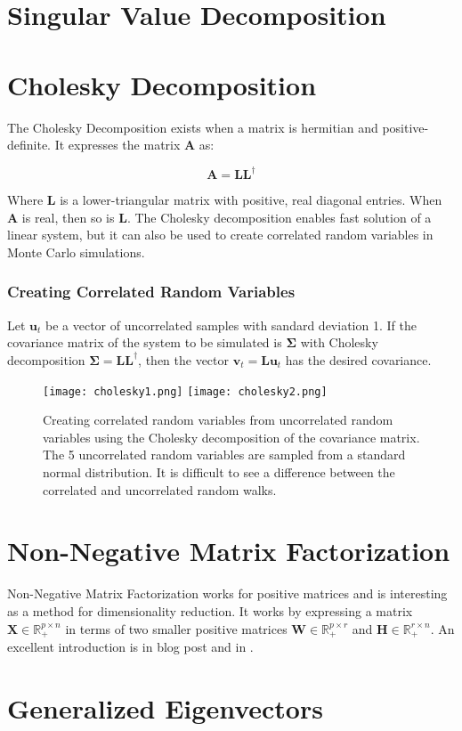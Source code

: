 \section{Singular Value Decomposition}




\section{Cholesky Decomposition}
\label{sec:cholesky}

The Cholesky Decomposition exists when a matrix is hermitian and positive-definite. It expresses the matrix $\mathbf{A}$ as:

\begin{equation}
\mathbf{A} = \mathbf{L}\mathbf{L^\dagger}
\end{equation}

Where $\mathbf{L}$ is a lower-triangular matrix with positive, real diagonal entries. When $\mathbf{A}$ is real, then so is $\mathbf{L}$. The Cholesky decomposition enables fast solution of a linear system, but it can also be used to create correlated random variables in Monte Carlo simulations. 

\subsubsection{Creating Correlated Random Variables}
Let $\mathbf{u}_t$ be a vector of uncorrelated samples with sandard deviation 1. If the covariance matrix of the system to be simulated is  $\mathbf{\Sigma}$ with Cholesky decomposition $\mathbf{\Sigma} = \mathbf{LL}^\dagger$, then the vector $\mathbf{v}_t = \mathbf{Lu}_t$ has the desired covariance.

\begin{figure}
\centering
\texttt{[image: cholesky1.png]}
\texttt{[image: cholesky2.png]}
\caption{Creating correlated random variables from uncorrelated random variables using the Cholesky decomposition of the covariance matrix. The 5 uncorrelated random variables are sampled from a standard normal distribution. It is difficult to see a difference between the correlated and uncorrelated random walks.}
\end{figure}

\section{Non-Negative Matrix Factorization}
Non-Negative Matrix Factorization works for positive matrices and is interesting as a method for dimensionality reduction. It works by expressing a matrix $\mathbf{X}\in\mathbb{R}^{p\times n}_+$ in terms of two smaller positive matrices $\mathbf{W}\in\mathbb{R}_+^{p\times r}$ and $\mathbf{H}\in \mathbb{R}^{r\times n}_+$. An excellent introduction is in  blog post and in . 


\section{Generalized Eigenvectors}









\chapauthor{}
